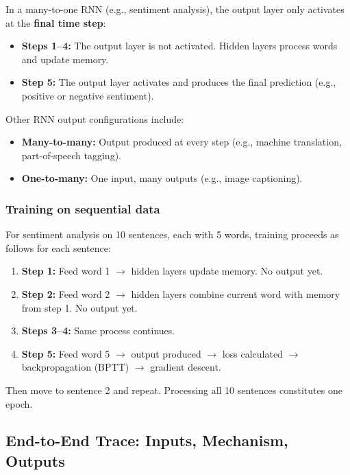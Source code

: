 \documentclass[12pt,a4paper]{article}
\begin{document}
In a many-to-one RNN (e.g., sentiment analysis), the output layer only activates at the
\textbf{final time step}:

\begin{itemize}
    \item \textbf{Steps 1--4:} The output layer is not activated. Hidden layers process
          words and update memory.
    \item \textbf{Step 5:} The output layer activates and produces the final prediction
          (e.g., positive or negative sentiment).
\end{itemize}

Other RNN output configurations include:
\begin{itemize}
    \item \textbf{Many-to-many:} Output produced at every step (e.g., machine
          translation, part-of-speech tagging).
    \item \textbf{One-to-many:} One input, many outputs (e.g., image captioning).
\end{itemize}

\subsubsection{Training on sequential data}

For sentiment analysis on 10 sentences, each with 5 words, training proceeds as follows
for each sentence:

\begin{enumerate}
    \item \textbf{Step 1:} Feed word 1 $\to$ hidden layers update memory. No output yet.
    \item \textbf{Step 2:} Feed word 2 $\to$ hidden layers combine current word with
          memory from step 1. No output yet.
    \item \textbf{Steps 3--4:} Same process continues.
    \item \textbf{Step 5:} Feed word 5 $\to$ output produced $\to$ loss calculated $\to$
          backpropagation (BPTT) $\to$ gradient descent.
\end{enumerate}

Then move to sentence 2 and repeat. Processing all 10 sentences constitutes one epoch.

\subsection{End-to-End Trace: Inputs, Mechanism, Outputs}
\end{document}
